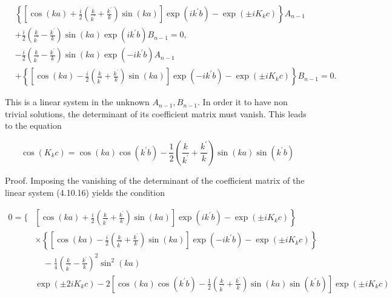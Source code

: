 \documentclass{article}
\begin{document}
\begin{align*}
& \left\{\left[\cos (k a)+\frac{i}{2}\left(\frac{k}{k^{\prime}}+\frac{k^{\prime}}{k}\right) \sin (k a)\right] \exp \left(i k^{\prime} b\right)-\exp \left( \pm i K_{k} c\right)\right\} A_{n-1}  \tag{4.10.16a}\\
& +\frac{i}{2}\left(\frac{k}{k^{\prime}}-\frac{k^{\prime}}{k}\right) \sin (k a) \exp \left(i k^{\prime} b\right) B_{n-1}=0, \\
& -\frac{i}{2}\left(\frac{k}{k^{\prime}}-\frac{k^{\prime}}{k}\right) \sin (k a) \exp \left(-i k^{\prime} b\right) A_{n-1}  \tag{4.10.16b}\\
& +\left\{\left[\cos (k a)-\frac{i}{2}\left(\frac{k}{k^{\prime}}+\frac{k^{\prime}}{k}\right) \sin (k a)\right] \exp \left(-i k^{\prime} b\right)-\exp \left( \pm i K_{k} c\right)\right\} B_{n-1}=0 .
\end{align*}
 

This is a linear system in the unknown $A_{n-1}, B_{n-1}$. In order it to have non trivial solutions, the determinant of its coefficient matrix must vanish. This leads to the equation
 
\begin{equation*}
\cos \left(K_{k} c\right)=\cos (k a) \cos \left(k^{\prime} b\right)-\frac{1}{2}\left(\frac{k}{k^{\prime}}+\frac{k^{\prime}}{k}\right) \sin (k a) \sin \left(k^{\prime} b\right) \tag{4.10.17}
\end{equation*}
 

Proof. Imposing the vanishing of the determinant of the coefficient matrix of the linear system (4.10.16) yields the condition
 
\begin{align*}
0=\{ & {\left.\left[\cos (k a)+\frac{i}{2}\left(\frac{k}{k^{\prime}}+\frac{k^{\prime}}{k}\right) \sin (k a)\right] \exp \left(i k^{\prime} b\right)-\exp \left( \pm i K_{k} c\right)\right\} }  \tag{4.10.18}\\
& \times\left\{\left[\cos (k a)-\frac{i}{2}\left(\frac{k}{k^{\prime}}+\frac{k^{\prime}}{k}\right) \sin (k a)\right] \exp \left(-i k^{\prime} b\right)-\exp \left( \pm i K_{k} c\right)\right\} \\
& \quad-\frac{1}{4}\left(\frac{k}{k^{\prime}}-\frac{k^{\prime}}{k}\right)^{2} \sin ^{2}(k a) \\
& \exp \left( \pm 2 i K_{k} c\right)-2\left[\cos (k a) \cos \left(k^{\prime} b\right)-\frac{1}{2}\left(\frac{k}{k^{\prime}}+\frac{k^{\prime}}{k}\right) \sin (k a) \sin \left(k^{\prime} b\right)\right] \exp \left( \pm i K_{k} c\right)
\end{align*}
 
\end{document}

